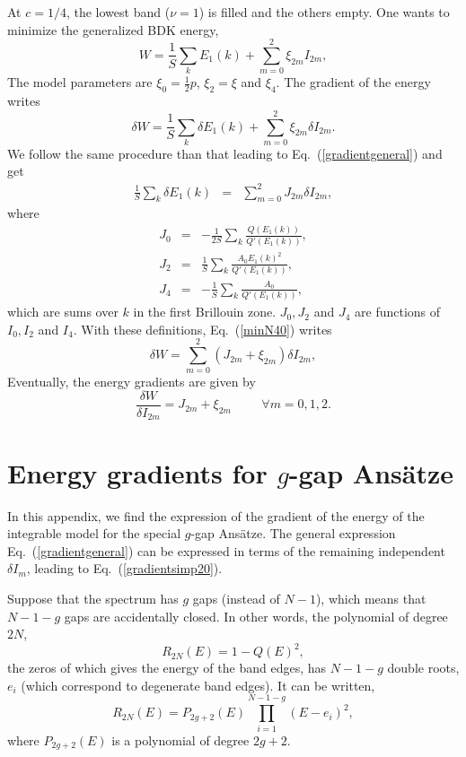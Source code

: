 \documentclass[]{revtex4-1}
\begin{document}
At $c=1/4$, the lowest band ($\nu=1$) is filled and the others empty. One wants to minimize the generalized BDK energy,
\begin{equation}
W= \frac{1}{S} \sum_{k} E_1(k) + \sum_{m=0}^2 \xi_{2m} I_{2m},
\end{equation}
The model parameters are $\xi_0=\frac{1}{2} p$, $\xi_2=\xi$ and $\xi_4$.  The gradient of the energy writes
\begin{equation}
\delta W= \frac{1}{S} \sum_{k} \delta E_1(k) + \sum_{m=0}^2 \xi_{2m} \delta I_{2m}.
\label{minN40} \end{equation}
We follow the same procedure than that leading to Eq.~(\ref{gradientgeneral}) and get
\begin{eqnarray}
 \frac{1}{S} \sum_{k} \delta E_1(k) &=& \sum_{m=0}^{2} J_{2m} \delta I_{2m},
\end{eqnarray}
where
\begin{eqnarray}
  J_{0} &=&   -\frac{1}{2S} \sum_{k}  \frac{Q(E_1(k))}{Q'(E_1(k))}, \label{J0d} \\
  J_{2} &=&   \frac{1}{S} \sum_{k}  \frac{A_0E_1(k)^2}{Q'(E_1(k))}, \\
  J_{4} &=&   -\frac{1}{S} \sum_{k}  \frac{A_0}{Q'(E_1(k))}, \label{J4d}
\end{eqnarray}
which are sums over $k$ in the first Brillouin zone. $J_0, J_2$ and $J_4$ are functions of $I_0, I_2$ and  $I_4$.
With these definitions, Eq.~(\ref{minN40}) writes
\begin{equation}
 \delta W= \sum_{m=0}^2 (J_{2m}+\xi_{2m})\delta I_{2m},
\label{minN4eq} \end{equation}
Eventually, the energy gradients are given by
\begin{equation}
\frac{ \delta W}{\delta I_{2m}}= J_{2m}+\xi_{2m} \hspace{1cm} \forall m=0,1,2.
\label{minN4eqg} \end{equation}

\section{Energy gradients for $g$-gap Ans\"atze}
\label{appA}
In this appendix, we find the expression of the gradient of the energy of the integrable model for the special $g$-gap Ans\"atze. The general expression Eq.~(\ref{gradientgeneral}) can be expressed in terms of the remaining independent $\delta I_m$, leading to Eq.~(\ref{gradientsimp20}).

Suppose that the spectrum has $g$ gaps (instead of $N-1$), which means that $N-1-g$ gaps are accidentally closed. In other words, the polynomial  of degree $2N$,
\begin{equation}
  R_{2N}(E)=1-Q(E)^2,
\end{equation}
the zeros of which gives the energy of the band edges, has $N-1-g$ double roots, $e_i$ (which correspond to degenerate band edges). It can be written,
\begin{equation}
R_{2N}(E) = P_{2g+2}(E) \prod_{i=1}^{N-1-g} (E-e_i)^2, \label{R2Ndoubleroots} 
\end{equation}
where $P_{2g+2}(E)$ is a polynomial of degree $2g+2$.
\end{document}
